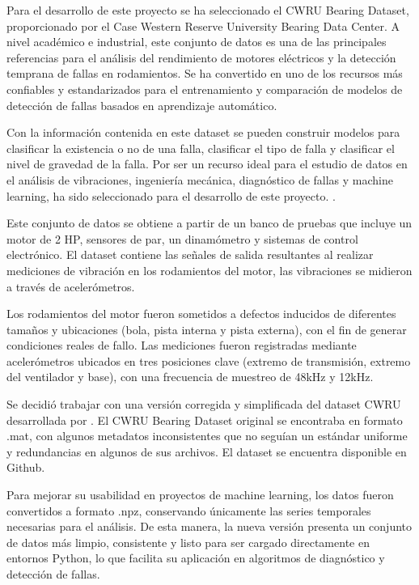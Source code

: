\documentclass[11pt,a4paper,spanish]{book}
\numberwithin{equation}{chapter}
\numberwithin{figure}{chapter}
\begin{document}
Para el desarrollo de este proyecto se ha seleccionado el CWRU Bearing Dataset, 
proporcionado por el Case Western Reserve University Bearing Data Center. 
A nivel académico e industrial, este conjunto de datos es una de las principales 
referencias para el análisis del rendimiento de motores eléctricos y la detección 
temprana de fallas en rodamientos. Se ha convertido en uno de los recursos más 
confiables y estandarizados para el entrenamiento y comparación de modelos de detección 
de fallas basados en aprendizaje automático.


Con la información contenida en este dataset se pueden construir modelos para 
clasificar la existencia o no de una falla, clasificar el tipo de falla y clasificar 
el nivel de gravedad de la falla. Por ser un recurso ideal para el estudio de datos en 
el análisis de vibraciones, ingeniería mecánica, diagnóstico de fallas y machine 
learning, ha sido seleccionado para el desarrollo de este proyecto. 
\cite{caseWesternBearingData}. 


Este conjunto de datos se obtiene a partir de un banco de pruebas que incluye un motor 
de 2 HP, sensores de par, un dinamómetro y sistemas de control electrónico. 
El dataset contiene las señales de salida resultantes al realizar mediciones de 
vibración en los rodamientos del motor, las vibraciones se midieron a través de 
acelerómetros.  


Los rodamientos del motor fueron sometidos a defectos inducidos de diferentes tamaños 
y ubicaciones (bola, pista interna y pista externa), con el fin de generar condiciones 
reales de fallo. Las mediciones fueron registradas mediante acelerómetros ubicados en 
tres posiciones clave (extremo de transmisión, extremo del ventilador y base), con una 
frecuencia de muestreo de 48kHz y 12kHz. 


Se decidió trabajar con una versión corregida y simplificada del dataset CWRU 
desarrollada por \cite{rigas2024marine}. El CWRU Bearing Dataset original se encontraba 
en formato .mat, con algunos metadatos inconsistentes que no seguían un estándar 
uniforme y redundancias en algunos de sus archivos. El dataset se encuentra disponible 
en Github. 


Para mejorar su usabilidad en proyectos de machine learning, los datos fueron 
convertidos a formato .npz, conservando únicamente las series temporales necesarias 
para el análisis. De esta manera, la nueva versión presenta un conjunto de datos más 
limpio, consistente y listo para ser cargado directamente en entornos Python, lo que 
facilita su aplicación en algoritmos de diagnóstico y detección de fallas.
\end{document}

